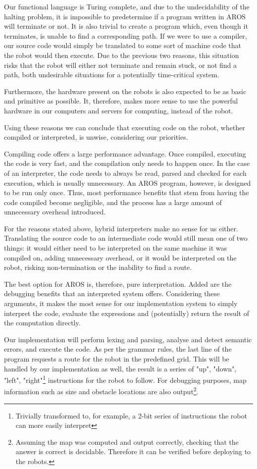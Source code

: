 Our functional language is Turing complete, and due to the undecidability of the halting problem, it is impossible to predetermine if a program written in AROS will terminate or not. It is also trivial to create a program which, even though it terminates, is unable to find a corresponding path. If we were to use a compiler, our source code would simply be translated to some sort of machine code that the robot would then execute. Due to the previous two reasons, this situation risks that the robot will either not terminate and remain stuck, or not find a path, both undesirable situations for a potentially time-critical system.
\par 
Furthermore, the hardware present on the robots is also expected to be as basic and primitive as possible. It, therefore, makes more sense to use the powerful hardware in our computers and servers for computing, instead of the robot. 
\par
Using these reasons we can conclude that executing code on the robot, whether compiled or interpreted, is unwise, considering our priorities. 
\par
Compiling code offers a large performance advantage. Once compiled, executing the code is very fast, and the compilation only needs to happen once. In the case of an interpreter, the code needs to always be read, parsed and checked for each execution, which is usually unnecessary. An AROS program, however, is designed to be run only once. Thus, most performance benefits that stem from having the code compiled become negligible, and the process has a large amount of unnecessary overhead introduced.
\par
For the reasons stated above, hybrid interpreters make no sense for us either. Translating the source code to an intermediate code would still mean one of two things: it would either need to be interpreted on the same machine it was compiled on, adding unnecessary overhead, or it would be interpreted on the robot, risking non-termination or the inability to find a route.
\par
The best option for AROS is, therefore, pure interpretation. Added are the debugging benefits that an interpreted system offers. Considering these arguments, it makes the most sense for our implementation system to simply interpret the code, evaluate the expressions and (potentially) return the result of the computation directly.
\par
Our implementation will perform lexing and parsing, analyse and detect semantic errors, and execute the code. As per the grammar rules, the last line of the program requests a route for the robot in the predefined grid. This will be handled by our implementation as well, the result is a series of "up", "down", "left", "right"\footnote{Trivially transformed to, for example, a 2-bit series of instructions the robot can more easily interpret} instructions for the robot to follow. For debugging purposes, map information such as size and obstacle locations are also output\footnote{Assuming the map was computed and output correctly, checking that the answer is correct is decidable. Therefore it can be verified before deploying to the robots.}.


